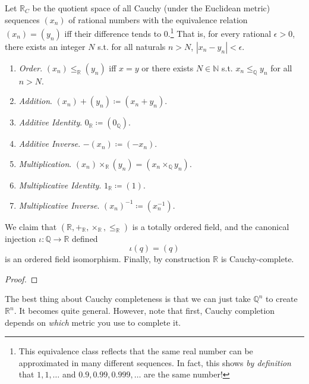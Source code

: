   \begin{definition}
    Let $\mathbb{R}_C$ be the quotient space of all Cauchy (under the Euclidean metric) sequences $(x_n)$ of rational numbers with the equivalence relation $(x_n) = (y_n)$ iff their difference tends to $0$.\footnote{This equivalence class reflects that the same real number can be approximated in many different sequences. In fact, this shows \textit{by definition} that $1, 1, \ldots$ and $0.9, 0.99, 0.999, \ldots$ are the same number!} That is, for every rational $\epsilon > 0$, there exists an integer $N$ s.t. for all naturals $n > N$, $|x_n - y_n| < \epsilon$. 
    \begin{enumerate}
      \item \textit{Order}. $(x_n) \leq_{\mathbb{R}} (y_n)$ iff $x = y$ or there exists $N \in \mathbb{N}$ s.t. $x_n \leq_{\mathbb{Q}} y_n$ for all $n > N$. 
      \item \textit{Addition}. $(x_n) + (y_n) \coloneqq (x_n + y_n)$. 
      \item \textit{Additive Identity}. $0_{\mathbb{R}} \coloneqq (0_{\mathbb{Q}})$. 
      \item \textit{Additive Inverse}. $-(x_n) \coloneqq (-x_n)$. 
      \item \textit{Multiplication}. $(x_n) \times_{\mathbb{R}} (y_n) = (x_n \times_{\mathbb{Q}} y_n)$. 
      \item \textit{Multiplicative Identity}. $1_{\mathbb{R}} \coloneqq (1)$. 
      \item \textit{Multiplicative Inverse}. $(x_n)^{-1} \coloneqq (x_n^{-1})$. 
    \end{enumerate}
    We claim that $(\mathbb{R}, +_{\mathbb{R}}, \times_{\mathbb{R}}, \leq_{\mathbb{R}})$ is a totally ordered field, and the canonical injection $\iota: \mathbb{Q} \rightarrow \mathbb{R}$ defined 
    \begin{equation}
      \iota(q) = (q)
    \end{equation} 
    is an ordered field isomorphism. Finally, by construction $\mathbb{R}$ is Cauchy-complete. 
  \end{definition}
  \begin{proof}
    
  \end{proof}

  The best thing about Cauchy completeness is that we can just take $\mathbb{Q}^n$ to create $\mathbb{R}^n$. It becomes quite general. However, note that first, Cauchy completion depends on \textit{which} metric you use to complete it. 

